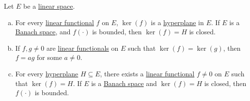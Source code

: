 \begin{proposition}\label{prop:lec5-2}
	Let \(E\) be a \hyperref[def:linear-vector-space]{linear space}.
	\begin{enumerate}[(a)]
		\item For every \hyperref[def:linear-functional]{linear functional} \(f\) on \(E\), \(\ker(f)\) is a \hyperref[def:hyperplane]{hyperplane} in \(E\). If \(E\) is a \hyperref[def:Banach-space]{Banach space}, and \(f(\cdot)\) is bounded, then \(\ker(f) = H\) is closed.
		\item If \(f, g \neq 0\) are \hyperref[def:linear-functional]{linear functionals} on \(E\) such that \(\ker(f) = \ker(g)\), then \(f = ag\) for some \(a \neq 0\).
		\item For every \hyperref[def:hyperplane]{hyperplane} \(H\subseteq E\), there exists a \hyperref[def:linear-functional]{linear functional} \(f \neq 0\) on \(E\) such that \(\ker(f) = H\). If \(E\) is a \hyperref[def:Banach-space]{Banach space} and \(\ker(f) = H\) is closed, then \(f(\cdot)\) is bounded.
	\end{enumerate}
\end{proposition}